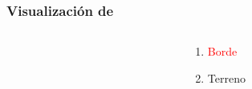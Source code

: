 \begin{frame}
 \frametitle{Visualización de \LARGE{}}
    \dedge
\begin{columns}
  \begin{column}{0.65\textwidth}
    \begin{center}
   \end{center}
  \end{column}
  \begin{column}{0.35\textwidth}
    \begin{enumerate}
      \item \textcolor{red}{Borde}
      \item \textcolor{yellow!95!black}{Terreno}
    \end{enumerate}
  \end{column}
\end{columns}
\end{frame}
